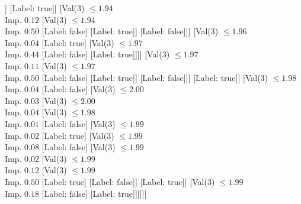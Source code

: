 \documentclass[margin=10pt]{standalone}
\begin{document}
\begin{forest}
											[Val($3$) $ \leq 1.97$ \\ Imp. $0.04$
												[Val($3$) $ \leq 1.95$ \\ Imp. $0.02$
													[Val($3$) $ \leq 1.94$ \\ Imp. $0.17$
														[Val($3$) $ \leq 1.93$ \\ Imp. $0.05$
															[Val($3$) $ \leq 1.93$ \\ Imp. $0.44$
																[Label: true]
																[Label: false]]
															[Label: true]]
														[Val($3$) $ \leq 1.94$ \\ Imp. $0.12$
															[Val($3$) $ \leq 1.94$ \\ Imp. $0.50$
																[Label: false]
																[Label: true]]
															[Label: false]]]
													[Val($3$) $ \leq 1.96$ \\ Imp. $0.04$
														[Label: true]
														[Val($3$) $ \leq 1.97$ \\ Imp. $0.44$
															[Label: false]
															[Label: true]]]]
												[Val($3$) $ \leq 1.97$ \\ Imp. $0.11$
													[Val($3$) $ \leq 1.97$ \\ Imp. $0.50$
														[Label: false]
														[Label: true]]
													[Label: false]]]
											[Label: true]]
										[Val($3$) $ \leq 1.98$ \\ Imp. $0.04$
											[Label: false]
											[Val($3$) $ \leq 2.00$ \\ Imp. $0.03$
												[Val($3$) $ \leq 2.00$ \\ Imp. $0.04$
													[Val($3$) $ \leq 1.98$ \\ Imp. $0.01$
														[Label: false]
														[Val($3$) $ \leq 1.99$ \\ Imp. $0.02$
															[Label: true]
															[Val($3$) $ \leq 1.99$ \\ Imp. $0.08$
																[Label: false]
																[Val($3$) $ \leq 1.99$ \\ Imp. $0.02$
																	[Val($3$) $ \leq 1.99$ \\ Imp. $0.12$
																		[Val($3$) $ \leq 1.99$ \\ Imp. $0.50$
																			[Label: true]
																			[Label: false]]
																		[Label: true]]
																	[Val($3$) $ \leq 1.99$ \\ Imp. $0.18$
																		[Label: false]
																		[Label: true]]]]]]

\end{forest}
\end{document}
